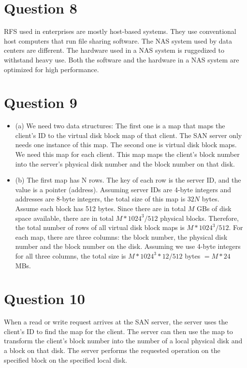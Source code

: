 \documentclass{article}
\begin{document}
\section{Question 8}
RFS used in enterprises are mostly host-based systems. They use conventional host computers that run file sharing software. The NAS system used by data centers are different. The hardware used in a NAS system is ruggedized to withstand heavy use. Both the software and the hardware in a NAS system are optimized for high performance.

\section{Question 9}
\begin{itemize}
    \item (a) We need two data structures: The first one is a map that maps the client's ID to the virtual disk block map of that client. The SAN server only needs one instance of this map. The second one is virtual disk block maps. We need this map for each client.  This map maps the client's block number into the server's physical disk number and the block number on that disk.
    \item (b) The first map has N rows. The key of each row is the server ID, and the value is a pointer (address). Assuming server IDs are 4-byte integers and addresses are 8-byte integers, the total size of this map is $32N$ bytes.\\
    Assume each block has 512 bytes. Since there are in total $M$ GBs of disk space available, there are in total $M * 1024^3 / 512$ physical blocks. Therefore, the total number of rows of all virtual disk block maps is $M * 1024^3 / 512$. For each map, there are three columns: the block number, the physical disk number and the block number on the disk. Assuming we use 4-byte integers for all three columns, the total size is $M * 1024^3 * 12 / 512$ bytes $= M * 24$ MBs.
\end{itemize}

\section{Question 10}
When a read or write request arrives at the SAN server, the server uses the client’s ID to find the map for the client. The server can then use the map to transform the client’s block number into the number of a local physical disk and a block on that disk. The server performs the requested operation on the specified block on the specified local disk.
\end{document}
